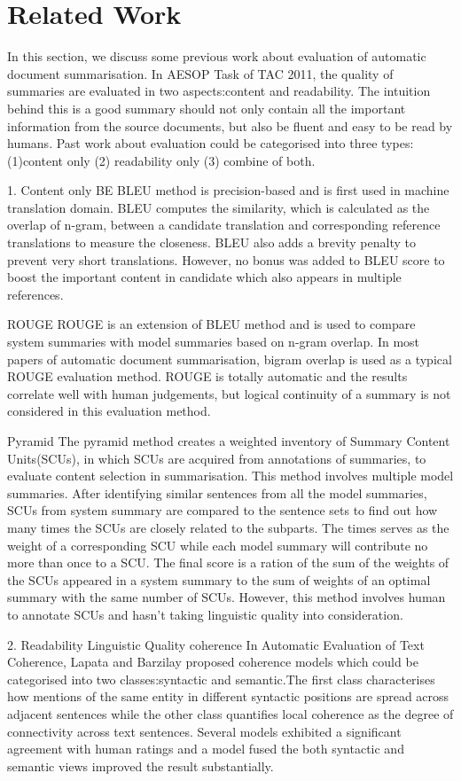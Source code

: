 \section{Related Work}
\label{sec:related}
In this section, we discuss some previous work about evaluation of automatic document summarisation. In AESOP Task of TAC 2011, the quality of summaries are evaluated in two aspects:content and readability. The intuition behind this is a good summary should not only contain all the important information from the source documents, but also be fluent and easy to be read by humans. Past work about evaluation could be categorised  into three types: (1)content only (2) readability only (3) combine of both.

1. Content only 
BE
BLEU method is precision-based and is first used in machine translation domain. BLEU computes the similarity, which is calculated as the overlap of n-gram, between a candidate translation and corresponding reference translations to measure the closeness. BLEU also adds a brevity penalty to prevent very short translations. However, no bonus was added to BLEU score to boost the important content in candidate which also appears in multiple references.

ROUGE
ROUGE is an extension of BLEU method and is used to compare system summaries with model summaries based on n-gram overlap. In most papers of automatic document summarisation, bigram overlap is used as a typical ROUGE evaluation method. ROUGE is totally automatic and the results correlate well with human judgements, but logical continuity of a summary is not considered in this evaluation method. 

Pyramid
The pyramid method creates a weighted inventory of Summary Content Units(SCUs), in which SCUs are acquired from annotations of summaries, to evaluate content selection in summarisation. This method involves multiple model summaries. After identifying similar sentences from all the model summaries, SCUs from system summary are compared to the sentence sets to find out how many times the SCUs are closely related to the subparts. The times serves as the weight of a corresponding SCU while each model summary will contribute no more than once to a SCU. The final score is a ration of the sum of the weights of the SCUs appeared in a system summary to the sum of weights of an optimal summary with the same number of SCUs. However, this method involves human to annotate SCUs and hasn’t taking linguistic quality into consideration.

2. Readability 
Linguistic Quality
coherence 
In Automatic Evaluation of Text Coherence, Lapata and Barzilay proposed coherence models which could be categorised into two classes:syntactic and semantic.The first class characterises how mentions of the same entity in different syntactic positions are spread across adjacent sentences while the other class quantifies local coherence as the degree of connectivity across text sentences. Several models exhibited a significant agreement with human ratings and a model fused the both syntactic and semantic views improved the result substantially.

